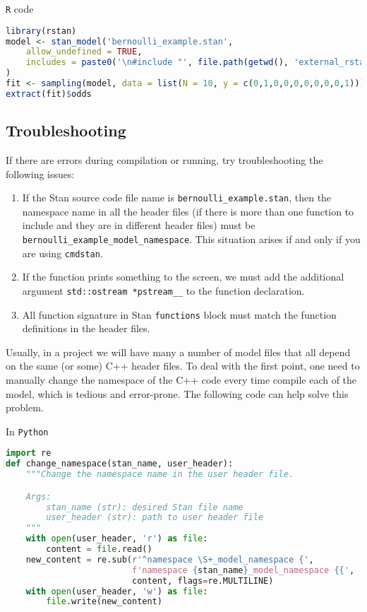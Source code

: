\documentclass[11pt]{article}
\begin{document}
\verb|R| code
\begin{lstlisting}[language=r, style=lgeneral]
library(rstan)
model <- stan_model('bernoulli_example.stan', 
    allow_undefined = TRUE,
    includes = paste0('\n#include "', file.path(getwd(), 'external_rstan.hpp'), '"\n'),
)
fit <- sampling(model, data = list(N = 10, y = c(0,1,0,0,0,0,0,0,0,1)))
extract(fit)$odds	
\end{lstlisting}




\subsection{Troubleshooting}
If there are errors during compilation or running, try troubleshooting the following issues:

\begin{enumerate}
	\item If the Stan source code file name is \verb|bernoulli_example.stan|, then the namespace name in all the header files (if there is more than one function to include and they are in different header files) must be \verb|bernoulli_example_model_namespace|. This situation arises if and only if you are using \verb|cmdstan|.
	\item If the function prints something to the screen, we must add the additional argument \verb|std::ostream *pstream__| to the function declaration.
	\item  All function signature in Stan \verb|functions| block must match the function definitions in the header files. 
\end{enumerate}


Usually, in a project we will have many a number of model files that all depend on the same (or some) C++ header files. To deal with the first point, one need to manually change the namespace of the C++ code every time compile each of the model, which is tedious and error-prone. The following code can help solve this problem.

In \verb|Python|
\begin{lstlisting}[language=python, style=lgeneral]
import re
def change_namespace(stan_name, user_header):
    """Change the namespace name in the user header file.

    Args:
        stan_name (str): desired Stan file name
        user_header (str): path to user header file
    """
    with open(user_header, 'r') as file:
        content = file.read()
    new_content = re.sub(r'^namespace \S+_model_namespace {',
                         f'namespace {stan_name}_model_namespace {{', 
                         content, flags=re.MULTILINE)
    with open(user_header, 'w') as file:
        file.write(new_content)
\end{lstlisting}
\end{document}
